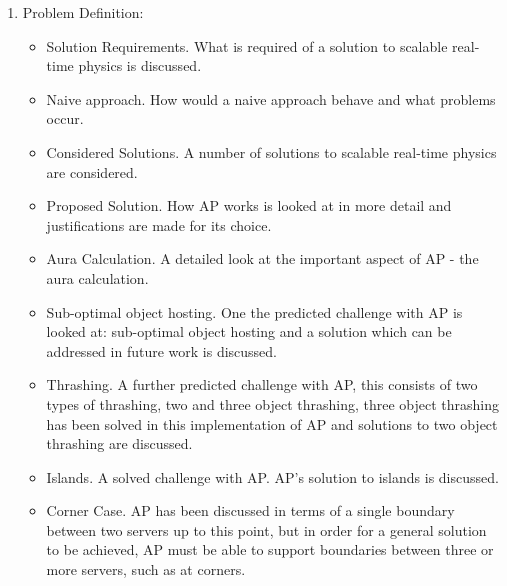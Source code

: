\begin{enumerate}
\item Problem Definition:
\begin{itemize}
	\item Solution Requirements. What is required of a solution to scalable real-time physics is discussed.
	\item Naive approach. How would a naive approach behave and what problems occur.
	\item Considered Solutions. A number of solutions to scalable real-time physics are considered.
	\item Proposed Solution. How AP works is looked at in more detail and justifications are made for its choice.
	\item Aura Calculation. A detailed look at the important aspect of AP - the aura calculation.
	\item Sub-optimal object hosting. One the predicted challenge with AP is looked at: sub-optimal object hosting and a solution which can be addressed in future work is discussed.
	\item Thrashing. A further predicted challenge with AP, this consists of two types of thrashing, two and three object thrashing, three object thrashing has been solved in this implementation of AP and solutions to two object thrashing are discussed.
	\item Islands. A solved challenge with AP. AP's solution to islands is discussed.
	\item Corner Case. AP has been discussed in terms of a single boundary between two servers up to this point, but in order for a general solution to be achieved, AP must be able to support boundaries between three or more servers, such as at corners.
\end{itemize}


\end{enumerate}
